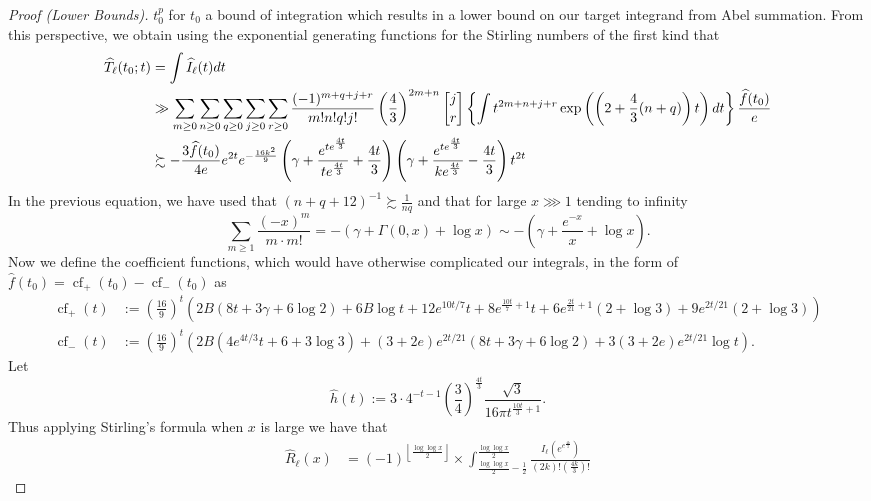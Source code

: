 \documentclass[11pt,reqno,a4letter]{article}
\numberwithin{figure}{section}
\numberwithin{table}{section}
\newcommand{\gkpSI}[2]{\ensuremath{\genfrac{\lbrack}{\rbrack}{0pt}{}{#1}{#2}}}
\newcommand{\Floor}[2]{\ensuremath{\left\lfloor \frac{#1}{#2} \right\rfloor}}
\theoremstyle{plain}
\numberwithin{theorem}{section}
\theoremstyle{definition}
\begin{document}
\begin{proof}[Proof (Lower Bounds)]
$t_0^p$ for $t_0$ a bound of integration which results in a lower bound on our target integrand from 
Abel summation. From this perspective, we obtain using the exponential generating functions for the 
Stirling numbers of the first kind that \cite[\S 7.4]{GKP}
\begin{align*}
\widehat{T}_{\ell}(t_0; t) & = \int \widehat{I}_{\ell}(t) dt \\ 
     & \gg \sum_{m \geq 0} \sum_{n \geq 0} \sum_{q \geq 0} \sum_{j \geq 0} \sum_{r \geq 0} 
     \frac{(-1)^{m+q+j+r}}{m! n! q! j!} \left(\frac{4}{3}\right)^{2m+n} \gkpSI{j}{r} 
     \left\{\int 
     t^{2m+n+j+r} \exp\left(\left(2 + \frac{4}{3}(n+q)\right) t\right) dt 
     \right\} \frac{\widehat{f}(t_0)}{e} \\ 
     & \succsim 
     -\frac{3 \widehat{f}(t_0)}{4e} e^{2t} e^{-\frac{16 k^2}{9}} \left( 
     \gamma + \frac{e^{te^{\frac{4t}{3}}}}{t e^{\frac{4t}{3}}} + \frac{4t}{3}
     \right) \left(
     \gamma + \frac{e^{te^{\frac{4t}{3}}}}{k e^{\frac{4t}{3}}} - \frac{4t}{3} 
     \right) t^{2t} 
\end{align*} 
In the previous equation, we have used that $(n+q+12)^{-1} \succsim \frac{1}{nq}$ and that 
for large $x \ggg 1$ tending to infinity 
\[
\sum_{m \geq 1} \frac{(-x)^m}{m \cdot m!} = -\left(\gamma + \Gamma(0, x) + \log x\right) \sim 
     -\left(\gamma + \frac{e^{-x}}{x} + \log x\right). 
\]
Now we define the coefficient functions, which would have otherwise complicated our integrals, 
in the form of $\widehat{f}(t_0) = \operatorname{cf}_{+}(t_0) - \operatorname{cf}_{-}(t_0)$ as 
\begin{align*}
\operatorname{cf}_{+}(t) & := \left(\frac{16}{9}\right)^t \left(2 B (8 t+3 \gamma +
     6 \log 2)+6 B \log t+12 e^{10 t/7} t+8 e^{\frac{10 t}{7}+1} t+6 e^{\frac{2 t}{21}+1}
     (2+\log 3)+9 e^{2 t/21} (2+\log 3)\right)\\ 
\operatorname{cf}_{-}(t) & := \left(\frac{16}{9}\right)^t \left(2 B \left(4 e^{4 t/3} t+6+3 
     \log 3\right)+(3+2 e) e^{2 t/21} (8 t+3 \gamma +6 \log 2)+3 (3+2 e) e^{2 t/21}
     \log t\right). 
\end{align*} 
Let 
\[
\widehat{h}(t) := 3 \cdot 4^{-t-1} \left(\frac{3}{4}\right)^{\frac{4t}{3}} \frac{\sqrt{3}}{ 
     16\pi t^{\frac{10t}{3}+1}}. 
\]
Thus applying Stirling's formula when $x$ is large we have that 
\begin{align} 
\label{proof_thm_GInvFunc_v2}  
\widehat{R}_{\ell}(x) & = (-1)^{\Floor{\log\log x}{2}} \times 
     \int_{\frac{\log\log x}{2}-\frac{1}{2}}^{\frac{\log\log x}{2}} 
     \frac{I_{\ell}\left(e^{e^{\frac{4k}{3}}}\right)}{(2k)! \left(\frac{4k}{3}\right)!} 

\end{align}
\end{proof}
\end{document}
